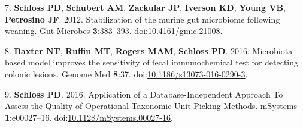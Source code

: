 \documentclass[
  12pt,
]{article}
\newenvironment{cslreferences}%
  {}%
  {\par}
\begin{document}
\begin{cslreferences}
\leavevmode\hypertarget{ref-schloss_stabilization_2012}{}%
7. \textbf{Schloss PD}, \textbf{Schubert AM}, \textbf{Zackular JP},
\textbf{Iverson KD}, \textbf{Young VB}, \textbf{Petrosino JF}. 2012.
Stabilization of the murine gut microbiome following weaning. Gut
Microbes \textbf{3}:383--393.
doi:\href{https://doi.org/10.4161/gmic.21008}{10.4161/gmic.21008}.

\leavevmode\hypertarget{ref-baxter_microbiota-based_2016}{}%
8. \textbf{Baxter NT}, \textbf{Ruffin MT}, \textbf{Rogers MAM},
\textbf{Schloss PD}. 2016. Microbiota-based model improves the
sensitivity of fecal immunochemical test for detecting colonic lesions.
Genome Med \textbf{8}:37.
doi:\href{https://doi.org/10.1186/s13073-016-0290-3}{10.1186/s13073-016-0290-3}.

\leavevmode\hypertarget{ref-schloss_application_2016}{}%
9. \textbf{Schloss PD}. 2016. Application of a Database-Independent
Approach To Assess the Quality of Operational Taxonomic Unit Picking
Methods. mSystems \textbf{1}:e00027--16.
doi:\href{https://doi.org/10.1128/mSystems.00027-16}{10.1128/mSystems.00027-16}.
\end{cslreferences}
\end{document}

